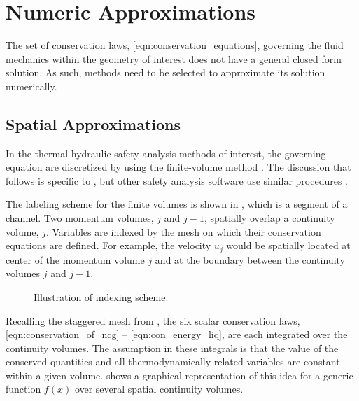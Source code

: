 \section{Numeric Approximations}
\label{sect:numeric_approximation}
The set of conservation laws, \eqref{eqn:conservation_equations}, governing the fluid mechanics within the geometry of interest does not have a general closed form solution.
As such, methods need to be selected to approximate its solution numerically.

\subsection{Spatial Approximations}
\label{subsect:spatial_approx}
In the thermal-hydraulic safety analysis methods of interest, the governing equation are discretized by using the finite-volume method \cite{LeVeque2002}.
The discussion that follows is specific to \cobra{}, but other safety analysis software use similar procedures \cite{RELAP,TRACE}.

The labeling scheme for the finite volumes is shown in , which is a segment of a channel.
Two momentum volumes, $j$ and $j-1$, spatially overlap a continuity volume, $j$.
Variables are indexed by the mesh on which their conservation equations are defined.
For example, the velocity $u_j$ would be spatially located at center of the momentum volume $j$ and at the boundary between the continuity volumes $j$ and $j-1$.

\begin{figure}[ht]
\begin{center}
\end{center}
\caption{Illustration of indexing scheme.}
\label{fig:vertical_pipe_with_cells}
\end{figure}

Recalling the staggered mesh from , the six scalar conservation laws, \eqref{eqn:conservation_of_ncg} -- \eqref{eqn:con_energy_liq}, are each integrated over the continuity volumes.
The assumption in these integrals is that the value of the conserved quantities and all thermodynamically-related variables are constant within a given volume.
 shows a graphical representation of this idea for a generic function $f(x)$ over several spatial continuity volumes. 

